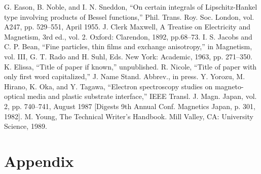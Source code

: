 \documentclass[conference]{IEEEtran}
\begin{document}
\begin{thebibliography}{00}
 G. Eason, B. Noble, and I. N. Sneddon, ``On certain integrals of Lipschitz-Hankel type involving products of Bessel functions,'' Phil. Trans. Roy. Soc. London, vol. A247, pp. 529--551, April 1955.
 J. Clerk Maxwell, A Treatise on Electricity and Magnetism, 3rd ed., vol. 2. Oxford: Clarendon, 1892, pp.68--73.
 I. S. Jacobs and C. P. Bean, ``Fine particles, thin films and exchange anisotropy,'' in Magnetism, vol. III, G. T. Rado and H. Suhl, Eds. New York: Academic, 1963, pp. 271--350.
 K. Elissa, ``Title of paper if known,'' unpublished.
 R. Nicole, ``Title of paper with only first word capitalized,'' J. Name Stand. Abbrev., in press.
 Y. Yorozu, M. Hirano, K. Oka, and Y. Tagawa, ``Electron spectroscopy studies on magneto-optical media and plastic substrate interface,'' IEEE Transl. J. Magn. Japan, vol. 2, pp. 740--741, August 1987 [Digests 9th Annual Conf. Magnetics Japan, p. 301, 1982].
 M. Young, The Technical Writer's Handbook. Mill Valley, CA: University Science, 1989.
\end{thebibliography}

\onecolumn

\section*{Appendix}
\small
























\end{document}
